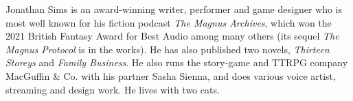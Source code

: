 Jonathan Sims is an award-winning writer, performer and game designer who is most well known for his fiction podcast \emph{The Magnus Archives}, which won the 2021 British Fantasy Award for Best Audio among many others (its sequel \emph{The Magnus Protocol} is in the works). He has also published two novels, \emph{Thirteen Storeys} and \emph{Family Business}. He also runs the story-game and TTRPG company MacGuffin \& Co. with his partner Sasha Sienna, and does various voice artist, streaming and design work. He lives with two cats.